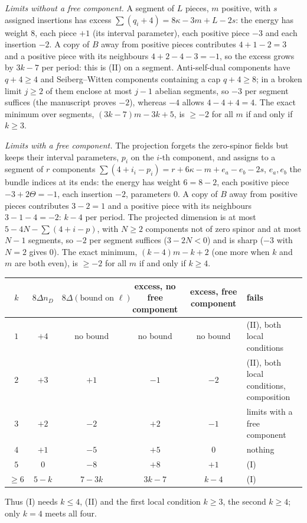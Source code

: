 \documentclass[10pt]{amsart}
\newenvironment{tab}{\par\vspace{2pt}\centering\small}{\par\vspace{2pt}}
\begin{document}
\emph{Limits without a free component.} A segment of $L$ pieces, $m$ positive, with $s$ assigned insertions has excess $\sum(q_i+4)=8\kappa-3m+L-2s$: the energy has weight $8$, each piece $+1$ (its interval parameter), each positive piece $-3$ and each insertion $-2$. A copy of $B$ away from positive pieces contributes $4+1-2=3$ and a positive piece with its neighbours $4+2-4-3=-1$, so the excess grows by $3k-7$ per period: this is (II) on a segment. Anti-self-dual components have $q+4\ge4$ and Seiberg--Witten components containing a cap $q+4\ge8$; in a broken limit $j\ge2$ of them enclose at most $j-1$ abelian segments, so $-3$ per segment suffices (the manuscript proves $-2$), whereas $-4$ allows $4-4+4=4$. The exact minimum over segments, $(3k-7)m-3k+5$, is $\ge-2$ for all $m$ if and only if $k\ge3$.

\emph{Limits with a free component.} The projection forgets the zero-spinor fields but keeps their interval parameters, $p_i$ on the $i$-th component, and assigns to a segment of $r$ components $\sum(4+i_i-p_i)=r+6\kappa-m+e_a-e_b-2s$, $e_a,e_b$ the bundle indices at its ends: the energy has weight $6=8-2$, each positive piece $-3+2\Theta=-1$, each insertion $-2$, parameters $0$. A copy of $B$ away from positive pieces contributes $3-2=1$ and a positive piece with its neighbours $3-1-4=-2$: $k-4$ per period. The projected dimension is at most $5-4N-\sum(4+i-p)$, with $N\ge2$ components not of zero spinor and at most $N-1$ segments, so $-2$ per segment suffices ($3-2N<0$) and is sharp ($-3$ with $N=2$ gives $0$). The exact minimum, $(k-4)m-k+2$ (one more when $k$ and $m$ are both even), is $\ge-2$ for all $m$ if and only if $k\ge4$.
\begin{tab}
\begin{tabular}{@{}cccccl@{}}
\toprule
$k$ & $8\Delta n_D$ & $8\Delta(\text{bound on }\ell)$ & excess, no free component & excess, free component & fails\\
\midrule
$1$ & $+4$ & no bound & no bound & no bound & (II), both local conditions\\
$2$ & $+3$ & $+1$ & $-1$ & $-2$ & (II), both local conditions, composition\\
$3$ & $+2$ & $-2$ & $+2$ & $-1$ & limits with a free component\\
$4$ & $+1$ & $-5$ & $+5$ & $0$ & nothing\\
$5$ & $0$ & $-8$ & $+8$ & $+1$ & (I)\\
$\ge6$ & $5-k$ & $7-3k$ & $3k-7$ & $k-4$ & (I)\\
\bottomrule
\end{tabular}
\end{tab}
Thus (I) needs $k\le4$, (II) and the first local condition $k\ge3$, the second $k\ge4$; only $k=4$ meets all four.
\end{document}
